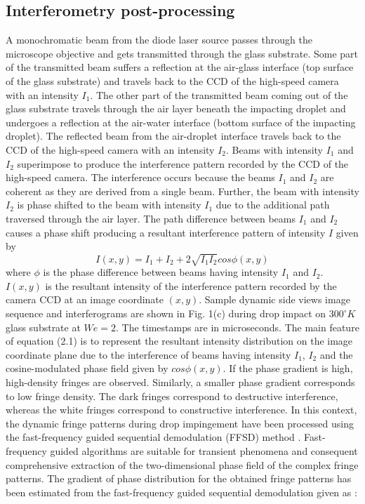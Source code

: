 \documentclass{jfm}
\begin{document}
\subsection{Interferometry post-processing} 
A monochromatic beam from the diode laser source passes through the microscope objective and gets transmitted through the glass substrate. Some part of the transmitted beam suffers a reflection at the air-glass interface (top surface of the glass substrate) and travels back to the CCD of the high-speed camera with an intensity $I_1$. The other part of the transmitted beam coming out of the glass substrate travels through the air layer beneath the impacting droplet and undergoes a reflection at the air-water interface (bottom surface of the impacting droplet). The reflected beam from the air-droplet interface travels back to the CCD of the high-speed camera with an intensity $I_2$. Beams with intensity $I_1$ and $I_2$ superimpose to produce the interference pattern recorded by the CCD of the high-speed camera. The interference occurs because the beams $I_1$ and $I_2$ are coherent as they are derived from a single beam. Further, the beam with intensity $I_2$ is phase shifted to the beam with intensity $I_1$ due to the additional path traversed through the air layer. The path difference between beams $I_1$ and $I_2$ causes a phase shift producing a resultant interference pattern of intensity $I$ given by \citep{daniel2017oleoplaning,limozin2009quantitative,sugiyama2006single} 
\begin{equation}
I(x,y) = I_1+I_2+2\sqrt{I_1I_2}cos{\phi}(x,y)
\end{equation}
where ${\phi}$ is the phase difference between beams having intensity $I_1$ and $I_2$. $I(x,y)$ is the resultant intensity of the interference pattern recorded by the camera CCD at an image coordinate $(x,y)$. Sample dynamic side views image sequence and interferograms are shown in Fig. 1(c) during drop impact on $300^{\circ}K$ glass substrate at $We=2$. The timestamps are in microseconds.
The main feature of equation (2.1) is to represent the resultant intensity distribution on the image coordinate plane due to the interference of beams having intensity $I_1$, $I_2$ and the cosine-modulated phase field given by $cos{\phi}(x,y)$. If the phase gradient is high, high-density fringes are observed. Similarly, a smaller phase gradient corresponds to low fringe density. The dark fringes correspond to destructive interference, whereas the white fringes correspond to constructive interference. In this context, the dynamic fringe patterns during drop impingement have been processed using the fast-frequency guided sequential demodulation (FFSD) method \citep{kai2010fast,wang2009frequency}. Fast-frequency guided algorithms are suitable for transient phenomena and consequent comprehensive extraction of the two-dimensional phase field of the complex fringe patterns. The gradient of phase distribution for the obtained fringe patterns has been estimated from the fast-frequency guided sequential demodulation given as \citep{roy2022droplet,kai2010fast}:
\end{document}

